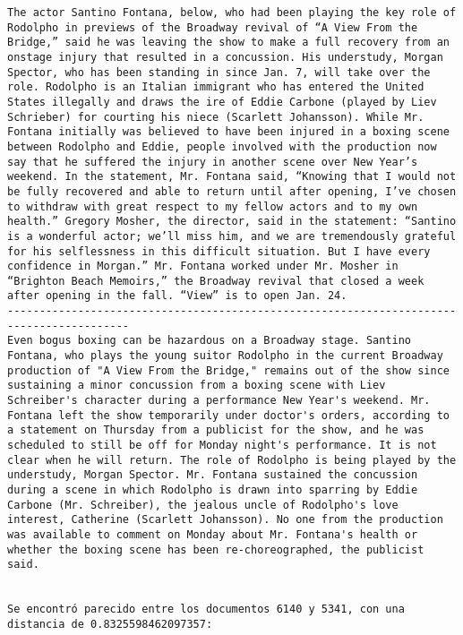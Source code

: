 \documentclass[11pt]{article}
\begin{document}
\begin{Verbatim}[commandchars=\\\{\}]
The actor Santino Fontana, below, who had been playing the key role of Rodolpho in previews of the Broadway revival of “A View From the Bridge,” said he was leaving the show to make a full recovery from an onstage injury that resulted in a concussion. His understudy, Morgan Spector, who has been standing in since Jan. 7, will take over the role. Rodolpho is an Italian immigrant who has entered the United States illegally and draws the ire of Eddie Carbone (played by Liev Schrieber) for courting his niece (Scarlett Johansson). While Mr. Fontana initially was believed to have been injured in a boxing scene between Rodolpho and Eddie, people involved with the production now say that he suffered the injury in another scene over New Year’s weekend. In the statement, Mr. Fontana said, “Knowing that I would not be fully recovered and able to return until after opening, I’ve chosen to withdraw with great respect to my fellow actors and to my own health.” Gregory Mosher, the director, said in the statement: “Santino is a wonderful actor; we’ll miss him, and we are tremendously grateful for his selflessness in this difficult situation. But I have every confidence in Morgan.” Mr. Fontana worked under Mr. Mosher in “Brighton Beach Memoirs,” the Broadway revival that closed a week after opening in the fall. “View” is to open Jan. 24.
-----------------------------------------------------------------------------------------
Even bogus boxing can be hazardous on a Broadway stage. Santino Fontana, who plays the young suitor Rodolpho in the current Broadway production of "A View From the Bridge," remains out of the show since sustaining a minor concussion from a boxing scene with Liev Schreiber's character during a performance New Year's weekend. Mr. Fontana left the show temporarily under doctor's orders, according to a statement on Thursday from a publicist for the show, and he was scheduled to still be off for Monday night's performance. It is not clear when he will return. The role of Rodolpho is being played by the understudy, Morgan Spector. Mr. Fontana sustained the concussion during a scene in which Rodolpho is drawn into sparring by Eddie Carbone (Mr. Schreiber), the jealous uncle of Rodolpho's love interest, Catherine (Scarlett Johansson). No one from the production was available to comment on Monday about Mr. Fontana's health or whether the boxing scene has been re-choreographed, the publicist said.


Se encontró parecido entre los documentos 6140 y 5341, con una distancia de 0.8325598462097357:



\end{Verbatim}
\end{document}
